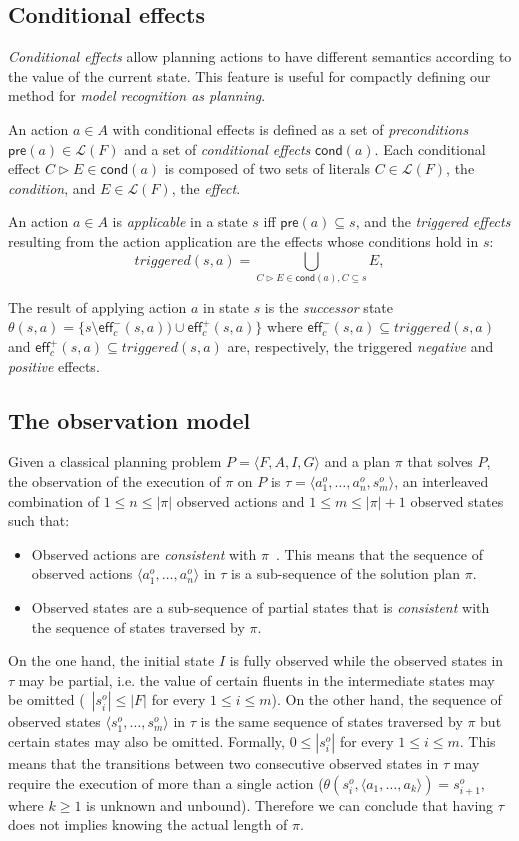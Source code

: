 \documentclass[letterpaper]{article} %
\newcommand{\tup}[1]{{\langle #1 \rangle}}
\newcommand{\pre}{\mathsf{pre}}     %
\newcommand{\eff}{\mathsf{eff}}     %
\newcommand{\cond}{\mathsf{cond}}   %
\begin{document}
\subsection{Conditional effects}
{\em Conditional effects} allow planning actions to have different semantics according to the value of the current state. This feature is useful for compactly defining our method for {\em model recognition as planning}. 

An action $a\in A$ with conditional effects is defined as a set of {\em preconditions} $\pre(a)\in\mathcal{L}(F)$ and a set of {\em conditional effects} $\cond(a)$. Each conditional effect $C\rhd E\in\cond(a)$ is composed of two sets of literals $C\in\mathcal{L}(F)$, the {\em condition}, and $E\in\mathcal{L}(F)$, the {\em effect}.

An action $a\in A$ is {\em applicable} in a state $s$ iff $\pre(a)\subseteq s$, and the {\em triggered effects} resulting from the action application are the effects whose conditions hold in $s$:
\[
triggered(s,a)=\bigcup_{C\rhd E\in\cond(a),C\subseteq s} E,
\]

The result of applying action $a$ in state $s$ is the {\em successor} state $\theta(s,a)=\{s\setminus\eff_c^-(s,a))\cup\eff_c^+(s,a)\}$ where $\eff_c^-(s,a)\subseteq triggered(s,a)$ and $\eff_c^+(s,a)\subseteq triggered(s,a)$ are, respectively, the triggered {\em negative} and {\em positive} effects.

\subsection{The observation model}
Given a classical planning problem $P=\tup{F,A,I,G}$ and a plan $\pi$ that solves $P$, the observation of the execution of  $\pi$ on $P$ is $\tau=\tup{a_1^o, \ldots , a_n^o, s_m^o}$, an interleaved combination of {\small $1\leq n\leq |\pi|$} observed actions and {\small $1\leq m\leq |\pi|+1$} observed states such that:
\begin{itemize}
\item Observed actions are {\em consistent} with $\pi$~\cite{ramirez2009plan}. This means that the sequence of observed actions $\tup{a_1^o, \ldots, a_n^o}$ in $\tau$ is a sub-sequence of the solution plan $\pi$.
\item Observed states are a sub-sequence  of partial states that is {\em consistent} with the sequence of states traversed by $\pi$. 
\end{itemize}

On the one hand, the initial state $I$ is fully observed while the observed states in $\tau$ may be partial, i.e. the value of certain fluents in the intermediate states may be omitted (~$|s_i^o|\leq |F|$ for every $1\leq i\leq m$). On the other hand, the sequence of observed states $\tup{s_1^o, \ldots, s_m^o}$ in $\tau$ is the same sequence of states traversed by $\pi$ but certain states may also be omitted. Formally, $0\leq|s_i^o|$ for every $1\leq i\leq m$. This means that the transitions between two consecutive observed states in $\tau$ may require the execution of more than a single action ($\theta(s_i^o,\tup{a_1,\ldots,a_k})=s_{i+1}^o$, where $k\geq 1$ is unknown and unbound). Therefore we can conclude that having $\tau$ does not implies knowing the actual length of $\pi$.
\end{document}
